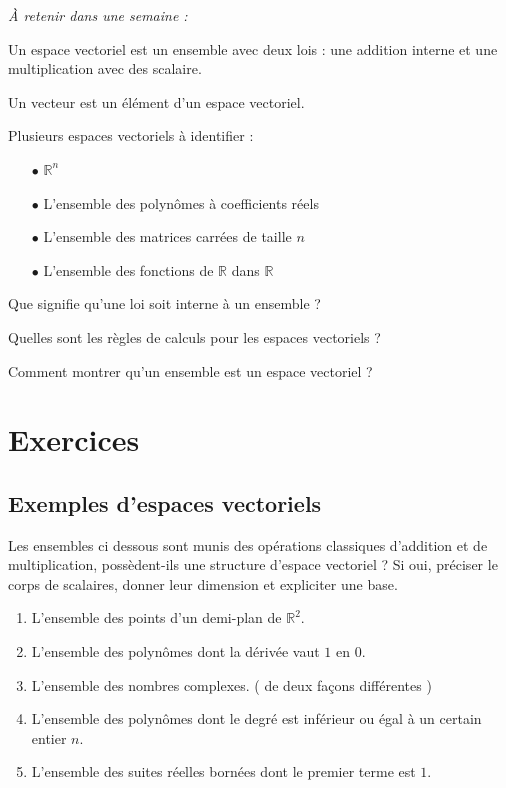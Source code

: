 
\begin{resumeBox}
  \emph{À retenir dans une semaine :} 
  \begin{niceitemize}
    \item Un espace vectoriel est un ensemble avec deux lois : une addition interne et une multiplication avec des scalaire.
    \item Un vecteur est un élément d'un espace vectoriel.
    \item Plusieurs espaces vectoriels à identifier :
      \begin{itemize}
        \item[$\bullet$] $\mathbb{R}^n$
        \item[$\bullet$] L'ensemble des polynômes à coefficients réels
        \item[$\bullet$] L'ensemble des matrices carrées de taille $n$
        \item[$\bullet$] L'ensemble des fonctions de $\mathbb{R}$ dans $\mathbb{R}$
      \end{itemize}
  \end{niceitemize}
\end{resumeBox}

\begin{rappelsBox}
  \begin{niceitemize}
    \item Que signifie qu'une loi soit interne à un ensemble ?
    \item Quelles sont les règles de calculs pour les espaces vectoriels ?
    \item Comment montrer qu'un ensemble est un espace vectoriel ?
  \end{niceitemize}
\end{rappelsBox}

\section{Exercices}
  \subsection{Exemples d'espaces vectoriels}

  Les ensembles ci dessous sont munis des opérations classiques d'addition et de multiplication, possèdent-ils une structure d'espace vectoriel ? \newline 
  Si oui, préciser le corps de scalaires, donner leur dimension et expliciter une base.
  
  \begin{enumerate}[i]
      \item L'ensemble des points d'un demi-plan de \(\mathbb{R}^2\).
      \item L'ensemble des polynômes dont la dérivée vaut $1$ en $0$.
      \item L'ensemble des nombres complexes. ( de deux façons différentes )
      \item L'ensemble des polynômes dont le degré est inférieur ou égal à un certain entier $n$.
      \item L'ensemble des suites réelles bornées dont le premier terme est $1$.
  \end{enumerate}
  
